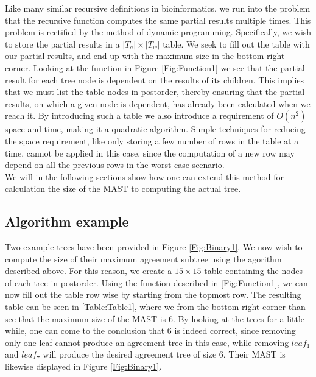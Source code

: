 Like many similar recursive definitions in bioinformatics, we run into the problem that the recursive function computes the same partial results multiple times. This problem is rectified by the method of dynamic programming. Specifically, we wish to store the partial results in a $|T_a| \times |T_w|$ table. We seek to fill out the table with our partial results, and end up with the maximum size in the bottom right corner.
Looking at the function in Figure \ref{Fig:Function1} we see that the partial result for each tree node is dependent on the results of its children. This implies that we must list the table nodes in postorder, thereby ensuring that the partial results, on which a given node is dependent, has already been calculated when we reach it. 
By introducing such a table we also introduce a requirement of $O(n^2)$ space and time, making it a quadratic algorithm. Simple techniques for reducing the space requirement, like only storing a few number of rows in the table at a time, cannot be applied in this case, since the computation of a new row may depend on all the previous rows in the worst case scenario.  
\\
We will in the following sections show how one can extend this method for calculation the size of the MAST to computing the actual tree.

\subsection{Algorithm example}
Two example trees have been provided in Figure \ref{Fig:Binary1}. We now wish to compute the size of their maximum agreement subtree using the agorithm described above. For this reason, we create a $15 \times 15$ table containing the nodes of each tree in postorder. Using the function described in \ref{Fig:Function1}, we can now fill out the table row wise by starting from the topmost row. The resulting table can be seen in \ref{Table:Table1}, where we from the bottom right corner than see that the maximum size of the MAST is 6. By looking at the trees for a little while, one can come to the conclusion that 6 is indeed correct, since removing only one leaf cannot produce an agreement tree in this case, while removing $leaf_1$ and $leaf_7$ will produce the desired agreement tree of size 6. Their MAST is likewise displayed in Figure \ref{Fig:Binary1}. 


